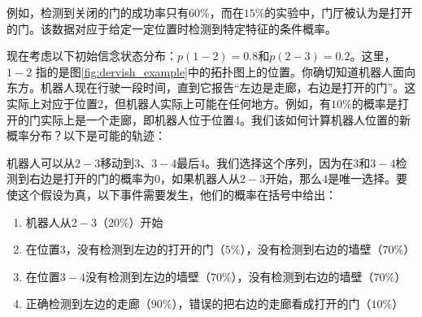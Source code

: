 例如，检测到关闭的门的成功率只有$60\%$，而在$15\%$的实验中，门厅被认为是打开的门。该数据对应于给定一定位置时检测到特定特征的条件概率。


现在考虑以下初始信念状态分布：$p(1-2)=0.8$和$p(2-3)=0.2$。这里，$1-2$ 指的是图\ref{fig:dervish_example}中的拓扑图上的位置。你确切知道机器人面向东方。机器人现在行驶一段时间，直到它报告“左边是走廊，右边是打开的门”。这实际上对应于位置2，但机器人实际上可能在任何地方。例如，有$10\%$的概率是打开的门实际上是一个走廊，即机器人位于位置4。我们该如何计算机器人位置的新概率分布？以下是可能的轨迹：


机器人可以从$2-3$移动到$3$、$3-4$最后$4$。我们选择这个序列，因为在$3$和$3-4$检测到右边是打开的门的概率为0，如果机器人从$2-3$开始，那么$4$是唯一选择。要使这个假设为真，以下事件需要发生，他们的概率在括号中给出：

\begin{enumerate}

\item 机器人从$2-3$（$20\%$）开始
\item 在位置$3$，没有检测到左边的打开的门（$5\%$），没有检测到右边的墙壁（$70\%$）
\item 在位置$3-4$没有检测到左边的墙壁（$70\%$），没有检测到右边的墙壁（$70\%$）
\item 正确检测到左边的走廊（$90\%$），错误的把右边的走廊看成打开的门（$10\%$）
\end{enumerate}


